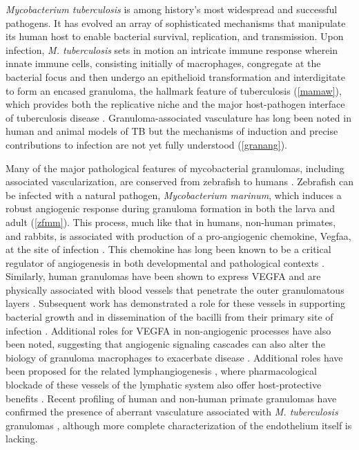 \textit{Mycobacterium tuberculosis} is among history's most widespread and successful pathogens. It has evolved an array of sophisticated mechanisms that manipulate its human host to enable bacterial survival, replication, and transmission. Upon infection, \textit{M. tuberculosis} sets in motion an intricate immune response wherein innate immune cells, consisting initially of macrophages, congregate at the bacterial focus and then undergo an epithelioid transformation and interdigitate to form an encased granuloma, the hallmark feature of tuberculosis (\autoref{mamaw}), which provides both the replicative niche and the major host\hyp{}pathogen interface of tuberculosis disease \citep{Cronan2016, Pagan2018, Cronan2021}. Granuloma\hyp{}associated vasculature has long been noted in human and animal models of TB \citep{Cudkowicz1952, Russell2010} but the mechanisms of induction and precise contributions to infection are not yet fully understood (\autoref{granang}).

Many of the major pathological features of mycobacterial granulomas, including associated vascularization, are conserved from zebrafish to humans \citep{Swaim2006, Bohrer2021}. Zebrafish can be infected with a natural pathogen, \textit{Mycobacterium marinum}, which induces a robust angiogenic response during granuloma formation in both the larva and adult (\autoref{zfmm}). This process, much like that in humans, non\hyp{}human primates, and rabbits, is associated with production of a pro\hyp{}angiogenic chemokine, Vegfaa, at the site of infection \citep{Oehlers2015}. This chemokine has long been known to be a critical regulator of angiogenesis in both developmental and pathological contexts \citep{Chung2011, Leung1989, Adams2007}. Similarly, human granulomas have been shown to express VEGFA and are physically associated with blood vessels that penetrate the outer granulomatous layers \citep{Datta2015}. Subsequent work has demonstrated a role for these vessels in supporting bacterial growth and in dissemination of the bacilli from their primary site of infection \citep{Polena2016}. Additional roles for VEGFA in non\hyp{}angiogenic processes have also been noted, suggesting that angiogenic signaling cascades can also alter the biology of granuloma macrophages to exacerbate disease \citep{Harding2019}. Additional roles have been proposed for the related lymphangiogenesis \citep{Alitalo2005, Duong2012, Lerner2020}, where pharmacological blockade of these vessels of the lymphatic system also offer host\hyp{}protective benefits \citep{Harding2015}. Recent profiling of human and non\hyp{}human primate granulomas have confirmed the presence of aberrant vasculature associated with \textit{M. tuberculosis} granulomas \citep{Gideon2022, McCaffrey2022, Cronan2021}, although more complete characterization of the endothelium itself is lacking.

